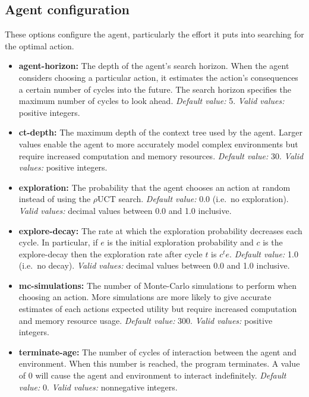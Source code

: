 \documentclass[a4paper,11pt]{article}
\begin{document}
\subsection{Agent configuration}
These options configure the agent, particularly the effort it puts into searching for the optimal action.
\begin{itemize}
\item {\bf agent-horizon:} The depth of the agent's search horizon. When the agent considers choosing a particular action, it estimates the action's consequences a certain number of cycles into the future. The search horizon specifies the maximum number of cycles to look ahead. {\em Default value:} 5. {\em Valid values:} positive integers.

\item {\bf ct-depth:} The maximum depth of the context tree used by the agent. Larger values enable the agent to more accurately model complex environments but require increased computation and memory resources. {\em Default value:} 30. {\em Valid values:} positive integers.

\item {\bf exploration:} The probability that the agent chooses an action at random instead of using the $\rho$UCT search. {\em Default value:} 0.0 (i.e.~no exploration). {\em Valid values:} decimal values between 0.0 and 1.0 inclusive.

\item {\bf explore-decay:} The rate at which the exploration probability decreases each cycle. In particular, if $e$ is the initial exploration probability and $c$ is the explore-decay then the exploration rate after cycle $t$ is $c^t e$. {\em Default value:} 1.0 (i.e.~no decay). {\em Valid values:} decimal values between 0.0 and 1.0 inclusive.

\item {\bf mc-simulations:} The number of Monte-Carlo simulations to perform when choosing an action. More simulations are more likely to give accurate estimates of each actions expected utility but require increased computation and memory resource usage. {\em Default value:} 300. {\em Valid values:} positive integers.

\item {\bf terminate-age:} The number of cycles of interaction between the agent and environment. When this number is reached, the program terminates. A value of 0 will cause the agent and environment to interact indefinitely. {\em Default value:} 0. {\em Valid values:} nonnegative integers.
\end{itemize}
\end{document}
